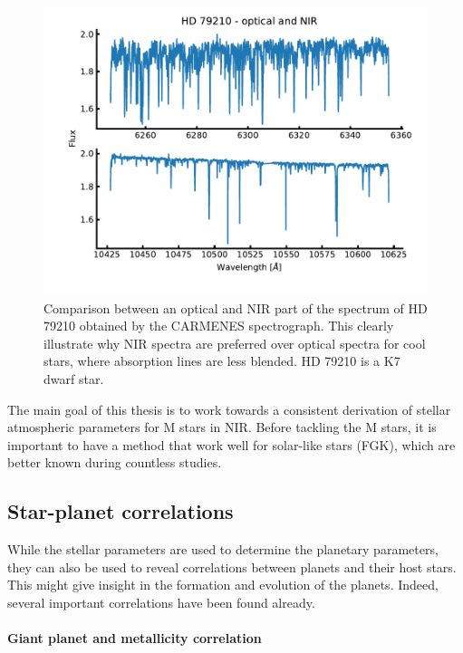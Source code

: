 \begin{figure}[htpb!]
    \centering
    \includegraphics[width=1.0\linewidth]{figures/opticalVSnir.pdf}
    \caption{Comparison between an optical and NIR part of the spectrum of HD 79210 obtained by
             the CARMENES spectrograph. This clearly illustrate why NIR spectra are preferred over
             optical spectra for cool stars, where absorption lines are less blended. HD 79210 is a
             K7 dwarf star.}
    \label{fig:opticalVSnir}
\end{figure}

The main goal of this thesis is to work towards a consistent derivation of stellar atmospheric
parameters for M stars in NIR. Before tackling the M stars, it is important to have a method that
work well for solar-like stars (FGK), which are better known during countless studies.

\subsection{Star-planet correlations}
\label{sec:starPlanetCorrelation}

While the stellar parameters are used to determine the planetary parameters, they can also be used
to reveal correlations between planets and their host stars. This might give insight in the
formation and evolution of the planets. Indeed, several important correlations have been found
already.

\paragraph{Giant planet and metallicity correlation}

